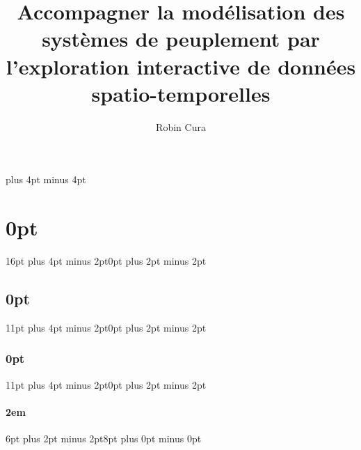 \usepackage{titling}
\title{Accompagner la modélisation des systèmes de peuplement par l’exploration interactive de données spatio-temporelles}
\author{Robin Cura}
\date{\vspace{-5ex}}
\makeatletter
\newcommand*{\toccontents}{\@starttoc{toc}}
\makeatother




\newskip\bigskipamount   \bigskipamount =20pt plus 4pt minus 4pt
\setlength{\parskip}{0.75em}
\setlength{\parindent}{2em}

\usepackage{titlesec}
\titlespacing\section{0pt}{16pt plus 4pt minus 2pt}{0pt plus 2pt minus 2pt}
\titlespacing\subsection{0pt}{11pt plus 4pt minus 2pt}{0pt plus 2pt minus 2pt}
\titlespacing\subsubsection{0pt}{11pt plus 4pt minus 2pt}{0pt plus 2pt minus 2pt}
\titlespacing\paragraph{2em}{6pt plus 2pt minus 2pt}{8pt plus 0pt minus 0pt}

\usepackage{pbox}
\usepackage{array}%